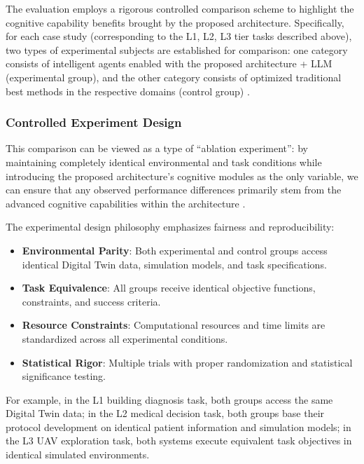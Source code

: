 The evaluation employs a rigorous controlled comparison scheme to highlight the cognitive capability benefits brought by the proposed architecture. Specifically, for each case study (corresponding to the L1, L2, L3 tier tasks described above), two types of experimental subjects are established for comparison: one category consists of intelligent agents enabled with the proposed architecture + LLM (experimental group), and the other category consists of optimized traditional best methods in the respective domains (control group) \cite{duan2022survey}.

\subsubsection{Controlled Experiment Design}

This comparison can be viewed as a type of ``ablation experiment'': by maintaining completely identical environmental and task conditions while introducing the proposed architecture's cognitive modules as the only variable, we can ensure that any observed performance differences primarily stem from the advanced cognitive capabilities within the architecture \cite{rogers2021primer}.

The experimental design philosophy emphasizes fairness and reproducibility:

\begin{itemize}
\item \textbf{Environmental Parity}: Both experimental and control groups access identical Digital Twin data, simulation models, and task specifications.
\item \textbf{Task Equivalence}: All groups receive identical objective functions, constraints, and success criteria.
\item \textbf{Resource Constraints}: Computational resources and time limits are standardized across all experimental conditions.
\item \textbf{Statistical Rigor}: Multiple trials with proper randomization and statistical significance testing.
\end{itemize}

For example, in the L1 building diagnosis task, both groups access the same Digital Twin data; in the L2 medical decision task, both groups base their protocol development on identical patient information and simulation models; in the L3 UAV exploration task, both systems execute equivalent task objectives in identical simulated environments.

